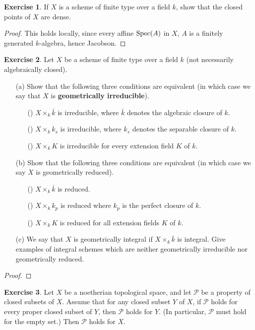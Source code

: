 \documentclass[11pt]{book}
\theoremstyle{definition}
\newtheorem{exercise}{Exercise}[section]
\begin{document}
\begin{exercise}
If $X$ is a scheme of finite type over a field $k$, show that the closed points of $X$ are dense.
\end{exercise}
\begin{proof}
This holds locally, since every affine $\mathrm{Spec}(A)$ in $X$, $A$ is a finitely generated $k$-algebra, hence Jacobson.
\end{proof}
\begin{exercise}
Let $X$ be a scheme of finite type over a field $k$ (not necessarily algebraically closed).
\begin{itemize}
\item[(a)] Show that the following three conditions are equivalent (in which case we say that $X$ is \textbf{geometrically irreducible}).
\begin{itemize}
\item[(\rmnum{1})] $X\times_k\bar{k}$ is irreducible, where $\bar{k}$ denotes the algebraic closure of $k$.
\item[(\rmnum{2})] $X\times_kk_s$ is irreducible, where $k_s$ denotes the separable closure of $k$.
\item[(\rmnum{3})] $X\times_kK$ is irreducible for every extension field $K$ of $k$.
\end{itemize} 
\item[(b)] Show that the following three conditions are equivalent (in which case we say $X$ is geometrically reduced).
\begin{itemize}
\item[(\rmnum{1})] $X\times_k\bar{k}$ is reduced.
\item[(\rmnum{2})] $X\times_kk_p$ is reduced where $k_p$ is the perfect closure of $k$.
\item[(\rmnum{3})] $X\times_kK$ is reduced for all extension fields $K$ of $k$.
\end{itemize} 
\item[(c)] We say that $X$ is geometrically integral if $X\times_k\bar{k}$ is integral. Give examples of integral schemes which are neither geometrically irreducible nor geometrically reduced.
\end{itemize}
\end{exercise}
\begin{proof}

\end{proof}
\begin{exercise}
Let $X$ be a noetherian topological space, and let $\mathcal{P}$ be a property of closed subsets of $X$. Assume that for any closed subset $Y$ of $X$, if $\mathcal{P}$ holds for every proper closed subset of $Y$, then $\mathcal{P}$ holds for $Y$. (In particular, $\mathcal{P}$ must hold for the empty set.) Then $\mathcal{P}$ holds for $X$.
\end{exercise}
\end{document}
